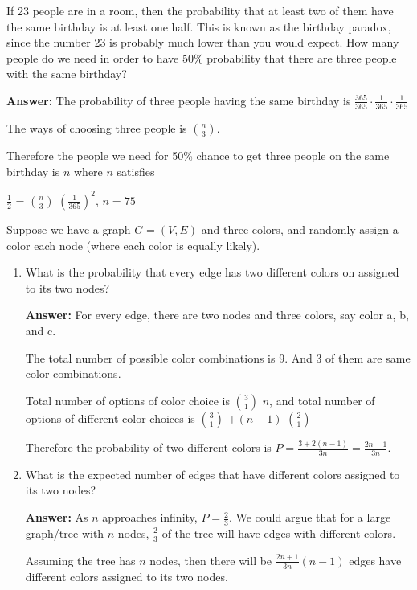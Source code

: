 \documentclass{article}
\author{Group 13: Elliott Pryor, Ben Bushnell, Shengnan Zhou}
\date{due: 18 October 2019}
\begin{document}
\nextprob
If 23 people are in a room, then the probability that at least two of them have
the same birthday is at least one half.  This is known as the birthday paradox,
since the number 23 is probably much lower than you would expect.  How many
people do we need in order to have 50\% probability that there are three people
with the same birthday?


\textbf{Answer: }  The probability of three people having the same birthday is $\frac{365}{365} \cdot \frac{1}{365} \cdot \frac{1}{365}$

The ways of choosing three people is $n\choose{3}$.

Therefore the people we need for 50\% chance to get three people on the same birthday is $n$ where $n$ satisfies

$\frac{1}{2}$ = $n \choose 3$ $(\frac{1}{365})^2 $, $n = 75$


\nextprob
Suppose we have a graph $G=(V,E)$ and three colors, and randomly assign a color
each node (where each color is equally likely).
\begin{enumerate}
   \item What is the probability that every edge has two different colors on
        assigned to its two nodes?
        
        \textbf{Answer:} For every edge, there are two nodes and three colors, say color a, b, and c.
        
        The total number of possible color combinations is 9. And 3 of them are same color combinations.
        
        Total number of options of color choice is $3\choose 1$ $n$, and total number of options of different color choices is $3\choose 1$ $+ (n-1) $ $2\choose 1$
        
        Therefore the probability of two different colors is $P = \frac{3+2(n-1)}{3n} = \frac{2n+1}{3n}$.
               
    \item What is the expected number of edges that have different colors
        assigned to its two nodes?
        
        \textbf{Answer:} As $n$ approaches infinity, $P=\frac{2}{3}$. We could argue that for a large graph/tree with $n$ nodes,  $\frac{2}{3}$ of the tree will have edges with different colors. 
        
        Assuming the tree has $n$ nodes, then there will be $\frac{2n+1}{3n} (n-1)$ edges have different colors assigned to its two nodes.
        
\end{enumerate}
\end{document}
